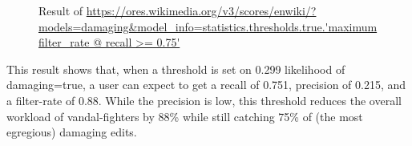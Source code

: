 \begin{figure}[htbp]
        \caption{Result of \url{https://ores.wikimedia.org/v3/scores/enwiki/?models=damaging&model_info=statistics.thresholds.true.'maximum filter_rate @ recall >= 0.75'}}
        \label{fig:english_damaging_threshold_optimization}
\end{figure}

This result shows that, when a threshold is set on 0.299 likelihood of damaging=true, a user can expect to get a recall of 0.751, precision of 0.215, and a filter-rate of 0.88.  While the precision is low, this threshold reduces the overall workload of vandal-fighters by 88\% while still catching 75\% of (the most egregious) damaging edits.